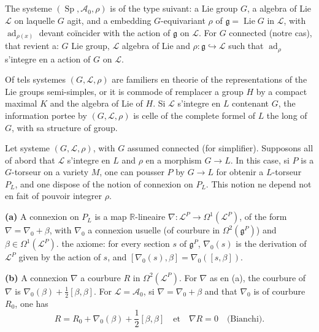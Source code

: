 \documentclass[11pt,a4paper]{article}
\theoremstyle{plain}
\theoremstyle{definition}
\DeclareMathOperator{\ad}{ad}
\DeclareMathOperator{\Lie}{Lie}
\DeclareMathOperator{\Sp}{Sp}
\newcommand{\R}{\mathbb{R}}
\begin{document}
\subsection{}
The systeme $(\Sp, \mathcal{A}_{0}, \rho)$ is of the type suivant: a Lie group $G$, a algebra of Lie $\mathcal{L}$ on laquelle $G$ agit, and a embedding $G$-equivariant $\rho$ of $\mathfrak{g} = \Lie G$ in $\mathcal{L}$, with $\ad_{\rho(x)}$ devant co\"incider with the action of $\mathfrak{g}$ on $\mathcal{L}$. For $G$ connected (notre cas), that revient a: $G$ Lie group, $\mathcal{L}$ algebra of Lie and $\rho: \mathfrak{g} \hookrightarrow \mathcal{L}$ such that $\ad_{\rho}$ s'integre en a action of $G$ on $\mathcal{L}$.

Of tels systemes $(G, \mathcal{L}, \rho)$ are familiers en theorie of the representations of the Lie groups semi-simples, or it is commode of remplacer a group $H$ by a compact maximal $K$ and the algebra of Lie of $H$. Si $\mathcal{L}$ s'integre en $L$ contenant $G$,
the information portee by $(G, \mathcal{L}, \rho)$ is celle of the complete formel of $L$ the long of $G$,
with sa structure of group.

Let systeme $(G, \mathcal{L}, \rho)$, with $G$ assumed connected (for simplifier). Supposons
all of abord that $\mathcal{L}$ s'integre en $L$ and $\rho$ en a morphism $G \to L$. In this case, si $P$
is a $G$-torseur on a variety $M$, one can pousser $P$ by $G \to L$ for obtenir a
$L$-torseur $P_{L}$, and one dispose of the notion of connexion on $P_{L}$. This notion ne depend not en fait of pouvoir integrer $\rho$.

\textbf{(a)} A connexion on $P_{L}$ is a map $\R$-lineaire $\nabla: \mathcal{L}^{P} \to \Omega^{1}(\mathcal{L}^{P})$, of the form $\nabla = \nabla_{0} + \beta$, with $\nabla_{0}$ a connexion usuelle (of courbure in $\Omega^{2}(\mathfrak{g}^{P})$) and $\beta \in \Omega^{1}(\mathcal{L}^{P})$. the axiome: for every section $s$ of $\mathfrak{g}^{P}$, $\nabla_{0}(s)$ is the derivation of $\mathcal{L}^{P}$ given by the action of $s$, and $[\nabla_{0}(s), \beta] = \nabla_{0}([s, \beta])$.

\textbf{(b)} A connexion $\nabla$ a courbure $R$ in $\Omega^{2}(\mathcal{L}^{P})$. For $\nabla$ as en (a), the courbure of $\nabla$ is $\nabla_{0}(\beta) + \frac{1}{2}[\beta,\beta]$. For $\mathcal{L} = \mathcal{A}_{0}$, si $\nabla = \nabla_{0} + \beta$ and that $\nabla_{0}$ is of courbure $R_{0}$, one has
\[
R = R_{0} + \nabla_{0}(\beta) + \frac{1}{2}[\beta,\beta] \quad \text{et} \quad \nabla R = 0 \quad \text{(Bianchi)}.
\]
\end{document}
